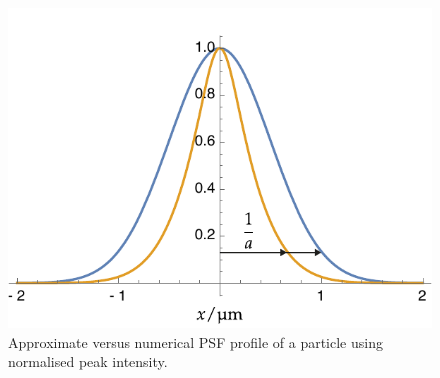 \begin{figure}
    \centering
        \includegraphics{./mathematica/guassian_peak}
  \caption{
  Approximate versus numerical \gls{PSF} profile of a particle using normalised peak intensity.%
  }\label{fig:guassian_peak}
\end{figure}

